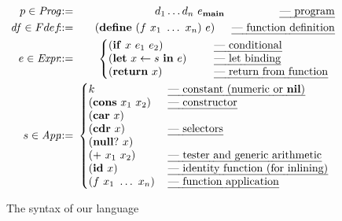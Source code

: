 \documentclass[9pt]{sigplanconf}
\newcommand{\ID}{\mbox{$\mathbf{ id}$}}
\begin{document}
\begin{figure}[t]
\footnotesize
\begin{eqnarray*}
   p \in \mathit{Prog} & \!\!\!::=\!\!\! & d_1 \ldots d_n \,\, e_\mainpgm
    \hspace{5em} \mbox{\em --- program}\\
    \mathit{df} \in Fdef & \!\!\!::=\!\!\! & (\DEFINE\,\, (f\,\, x_1 \,\, \ldots
\,\,x_n)\,\,
    e)
    \hspace{0.2em} \ \ \ \ \mbox{\em --- function definition} \\
e \in \mathit{Expr} & \!\!\!::=\!\!\! &
\left\{\begin{array}{@{}ll@{\hspace{2em}}l}
       (\SIF\,\, x\,\, e_1\,\, e_2) && \!\!\!\mbox{\em --- conditional} \\
       (\LET\,\, x \leftarrow s\,\, \IN\,\, e) &&\!\!\! \mbox{\em --- let
binding} \\
       (\SRETURN\,\, x) && \!\!\!\mbox{\em --- return from function}
    \end{array}\right. \\
s \in \mathit{App} & \!\!\!::=\!\!\!  &
\left\{\begin{array}{@{}l@{\hspace{1.2em}}l}
       k & \mbox{\em --- constant (numeric or $\NIL$)}\\
       (\CONS\,\, x_1\,\, x_2) & \mbox{\em --- constructor} \\
       (\CAR\,\, x) & \\
       (\CDR\,\, x) & \mbox{\em --- selectors} \\
       (\NULLQ\,\, x) & \\
       (\PRIM\,\, x_1\,\, x_2) & \mbox{\em ---  tester
and generic arithmetic} \\
       (\ID\,\, x) & \mbox{\em ---  identity function (for inlining)} \\
       (f\,\, x_1\,\,\ldots\,\, x_n) & \mbox{\em --- function application}
    \end{array}\right.
\end{eqnarray*}
  \caption{The syntax of our language}\label{fig:lang-syntax}
\figrule
\normalsize
\end{figure}
\end{document}
